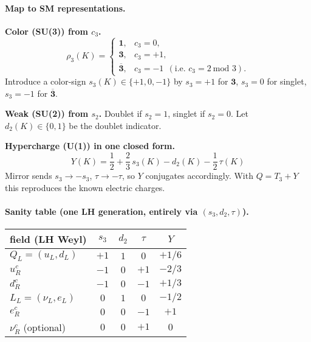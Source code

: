 \documentclass[11pt]{article}
\begin{document}
\paragraph{Map to SM representations.}
\textbf{Color (SU(3)) from $c_3$.}
\[
	\rho_3(K)=
	\begin{cases}
		\mathbf{1}, & c_3=0,\\
		\mathbf{3}, & c_3=+1,\\
		\overline{\mathbf{3}}, & c_3=-1\ \ (\text{i.e.\ }c_3=2\ \text{mod }3).
	\end{cases}
\]
Introduce a color-sign $s_3(K)\in\{+1,0,-1\}$ by $s_3=+1$ for $\mathbf 3$, $s_3=0$ for singlet, $s_3=-1$ for $\overline{\mathbf 3}$.
\smallskip

\noindent
\textbf{Weak (SU(2)) from $s_2$.}
Doublet if $s_2=1$, singlet if $s_2=0$. Let $d_2(K)\in\{0,1\}$ be the doublet indicator.
\smallskip

\noindent
\textbf{Hypercharge (U(1)) in one closed form.}
\[
	\boxed{\quad
	Y(K)=\frac{1}{2}+\frac{2}{3}\,s_3(K)-d_2(K)-\frac{1}{2}\,\tau(K)\quad}
\]
Mirror sends $s_3\to -s_3$, $\tau\to -\tau$, so $Y$ conjugates accordingly. With $Q=T_3+Y$ this reproduces the known electric charges.

\paragraph{Sanity table (one LH generation, entirely via $(s_3,d_2,\tau)$).}
\begin{center}\small
\begin{tabular}{lcccc}
	\toprule
	field (LH Weyl) & $s_3$ & $d_2$ & $\tau$ & $Y$ \\
	\midrule
	$Q_L=(u_L,d_L)$ & $+1$ & $1$ & $0$ & $+1/6$ \\
	$u_R^c$ & $-1$ & $0$ & $+1$ & $-2/3$ \\
	$d_R^c$ & $-1$ & $0$ & $-1$ & $+1/3$ \\
	$L_L=(\nu_L,e_L)$ & $0$ & $1$ & $0$ & $-1/2$ \\
	$e_R^c$ & $0$ & $0$ & $-1$ & $+1$ \\
	$\nu_R^c$ (optional) & $0$ & $0$ & $+1$ & $0$ \\
	\bottomrule
\end{tabular}
\end{center}
\end{document}
